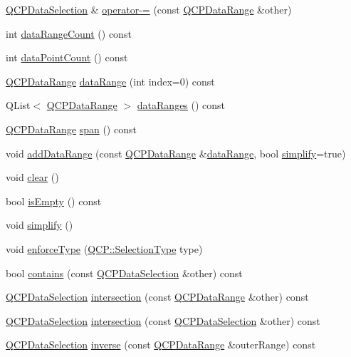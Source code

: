\begin{DoxyCompactItemize}
\hyperlink{class_q_c_p_data_selection}{Q\+C\+P\+Data\+Selection} \& \hyperlink{class_q_c_p_data_selection_a8d18b20d20dde737eefc10967e31cf73}{operator-\/=} (const \hyperlink{class_q_c_p_data_range}{Q\+C\+P\+Data\+Range} \&other)
\item 
int \hyperlink{class_q_c_p_data_selection_a7edbfbaf77e22f70216749e73818e247}{data\+Range\+Count} () const 
\item 
int \hyperlink{class_q_c_p_data_selection_a492de1528df9cc6a73fd2883fe5b47b9}{data\+Point\+Count} () const 
\item 
\hyperlink{class_q_c_p_data_range}{Q\+C\+P\+Data\+Range} \hyperlink{class_q_c_p_data_selection_a6a9c39a2019cd6d2fdd329f415262b34}{data\+Range} (int index=0) const 
\item 
Q\+List$<$ \hyperlink{class_q_c_p_data_range}{Q\+C\+P\+Data\+Range} $>$ \hyperlink{class_q_c_p_data_selection_a74b63e4a98eb5eba0f6d77d2d4161a9a}{data\+Ranges} () const 
\item 
\hyperlink{class_q_c_p_data_range}{Q\+C\+P\+Data\+Range} \hyperlink{class_q_c_p_data_selection_a28057205d0b066f96b26bed79184b32b}{span} () const 
\item 
void \hyperlink{class_q_c_p_data_selection_a46740c5aa7b80ae9b2abf6985d61b74f}{add\+Data\+Range} (const \hyperlink{class_q_c_p_data_range}{Q\+C\+P\+Data\+Range} \&\hyperlink{class_q_c_p_data_selection_a6a9c39a2019cd6d2fdd329f415262b34}{data\+Range}, bool \hyperlink{class_q_c_p_data_selection_a4a2fbad1a6e4d1dd26fdfdf88956f2a4}{simplify}=true)
\item 
void \hyperlink{class_q_c_p_data_selection_a385dd665e6690d39afb8bbd727b1e00b}{clear} ()
\item 
bool \hyperlink{class_q_c_p_data_selection_a9d77ad4a54418bd0b74ef6b8076561d0}{is\+Empty} () const 
\item 
void \hyperlink{class_q_c_p_data_selection_a4a2fbad1a6e4d1dd26fdfdf88956f2a4}{simplify} ()
\item 
void \hyperlink{class_q_c_p_data_selection_a17b84d852911531d229f4a76aa239a75}{enforce\+Type} (\hyperlink{namespace_q_c_p_ac6cb9db26a564b27feda362a438db038}{Q\+C\+P\+::\+Selection\+Type} type)
\item 
bool \hyperlink{class_q_c_p_data_selection_a6d7c10d033031c7d1c66948ab8beab0f}{contains} (const \hyperlink{class_q_c_p_data_selection}{Q\+C\+P\+Data\+Selection} \&other) const 
\item 
\hyperlink{class_q_c_p_data_selection}{Q\+C\+P\+Data\+Selection} \hyperlink{class_q_c_p_data_selection_a08371e0e97001f5f688047223123958b}{intersection} (const \hyperlink{class_q_c_p_data_range}{Q\+C\+P\+Data\+Range} \&other) const 
\item 
\hyperlink{class_q_c_p_data_selection}{Q\+C\+P\+Data\+Selection} \hyperlink{class_q_c_p_data_selection_adc25bacbc7268595b684ab060de351d7}{intersection} (const \hyperlink{class_q_c_p_data_selection}{Q\+C\+P\+Data\+Selection} \&other) const 
\item 
\hyperlink{class_q_c_p_data_selection}{Q\+C\+P\+Data\+Selection} \hyperlink{class_q_c_p_data_selection_a02c6253d87d72b8defbee2e6bfa8a494}{inverse} (const \hyperlink{class_q_c_p_data_range}{Q\+C\+P\+Data\+Range} \&outer\+Range) const 
\end{DoxyCompactItemize}
